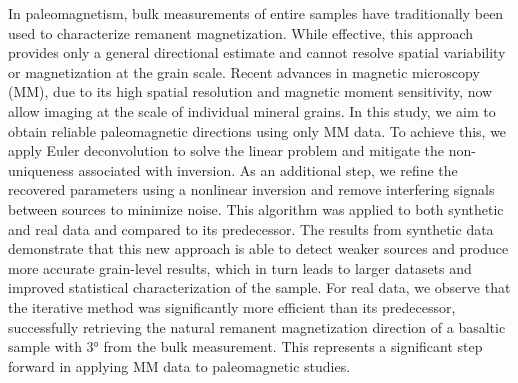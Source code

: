 In paleomagnetism, bulk measurements of entire samples have traditionally been used to characterize remanent magnetization. While effective, this approach provides only a general directional estimate and cannot resolve spatial variability or magnetization at the grain scale. Recent advances in magnetic microscopy (MM), due to its high spatial resolution and magnetic moment sensitivity, now allow imaging at the scale of individual mineral grains. In this study, we aim to obtain reliable paleomagnetic directions using only MM data. To achieve this, we apply Euler deconvolution to solve the linear problem and mitigate the non-uniqueness associated with inversion. As an additional step, we refine the recovered parameters using a nonlinear inversion and remove interfering signals between sources to minimize noise. This algorithm was applied to both synthetic and real data and compared to its predecessor. The results from synthetic data demonstrate that this new approach is able to detect weaker sources and produce more accurate grain-level results, which in turn leads to larger datasets and improved statistical characterization of the sample. For real data, we observe that the iterative method was significantly more efficient than its predecessor, successfully retrieving the natural remanent magnetization direction of a basaltic sample with \ang{3} from the bulk measurement. This represents a significant step forward in applying MM data to paleomagnetic studies.
